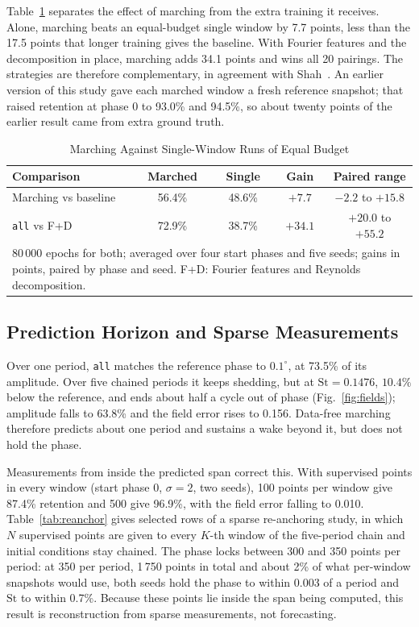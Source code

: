 \documentclass[conference]{IEEEtran}
\newcommand{\St}{\mathrm{St}}
\begin{document}
Table~\ref{tab:budget} separates the effect of marching from the extra
training it receives. Alone, marching beats an equal-budget single window by
7.7 points, less than the 17.5 points that longer training gives the baseline.
With Fourier features and the decomposition in place, marching adds 34.1
points and wins all 20 pairings. The strategies are therefore complementary,
in agreement with Shah~\cite{shah2026}. An earlier version of this study gave
each marched window a fresh reference snapshot; that raised retention at phase
0 to 93.0\% and 94.5\%, so about twenty points of the earlier result came from
extra ground truth.

\begin{table}[!t]
\centering
\caption{Marching Against Single-Window Runs of Equal Budget}
\label{tab:budget}
\setlength{\tabcolsep}{3pt}
\begin{tabular}{lcccc}
\toprule
Comparison & Marched & Single & Gain & Paired range \\
\midrule
Marching vs baseline   & 56.4\% & 48.6\% & $+7.7$  & $-2.2$ to $+15.8$ \\
\texttt{all} vs F+D    & 72.9\% & 38.7\% & $+34.1$ & $+20.0$ to $+55.2$ \\
\bottomrule
\multicolumn{5}{p{0.92\columnwidth}}{\footnotesize $80\,000$ epochs for both;
averaged over four start phases and five seeds; gains in points, paired by
phase and seed. F+D: Fourier features and Reynolds decomposition.}
\end{tabular}
\end{table}

\subsection{Prediction Horizon and Sparse Measurements}

Over one period, \texttt{all} matches the reference phase to $0.1^\circ$, at
73.5\% of its amplitude. Over five chained periods it keeps shedding, but at
$\St = 0.1476$, $10.4\%$ below the reference, and ends about half a cycle out
of phase (Fig.~\ref{fig:fields}); amplitude falls to 63.8\% and the field
error rises to 0.156. Data-free marching therefore predicts about one period
and sustains a wake beyond it, but does not hold the phase.

Measurements from inside the predicted span correct this. With supervised
points in every window (start phase 0, $\sigma = 2$, two seeds), 100 points
per window give 87.4\% retention and 500 give 96.9\%, with the field error
falling to 0.010. Table~\ref{tab:reanchor} gives selected rows of a sparse
re-anchoring study, in which $N$ supervised points are given to every $K$-th
window of the five-period chain and initial conditions stay chained. The phase
locks between 300 and 350 points per period: at 350 per period, 1\,750 points
in total and about 2\% of what per-window snapshots would use, both seeds hold
the phase to within 0.003 of a period and $\St$ to within 0.7\%. Because these
points lie inside the span being computed, this result is reconstruction from
sparse measurements, not forecasting.
\end{document}
